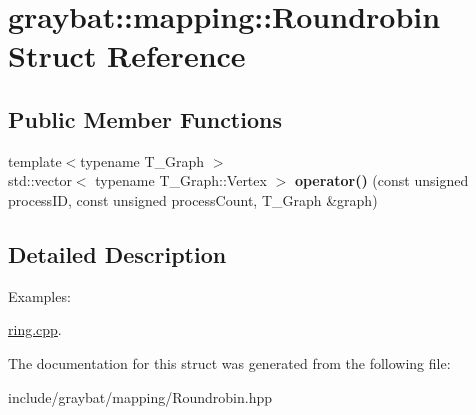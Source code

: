 \hypertarget{structgraybat_1_1mapping_1_1Roundrobin}{}\section{graybat\+:\+:mapping\+:\+:Roundrobin Struct Reference}
\label{structgraybat_1_1mapping_1_1Roundrobin}
\subsection*{Public Member Functions}
\begin{DoxyCompactItemize}
\item 
\hypertarget{structgraybat_1_1mapping_1_1Roundrobin_ab3d4c60dcd47a3827739cf824e3e0f6b}{}{\footnotesize template$<$typename T\+\_\+\+Graph $>$ }\\std\+::vector$<$ typename T\+\_\+\+Graph\+::\+Vertex $>$ {\bfseries operator()} (const unsigned process\+I\+D, const unsigned process\+Count, T\+\_\+\+Graph \&graph)\label{structgraybat_1_1mapping_1_1Roundrobin_ab3d4c60dcd47a3827739cf824e3e0f6b}

\end{DoxyCompactItemize}


\subsection{Detailed Description}
\begin{Desc}
\item[Examples\+: ]\par
\hyperlink{ring_8cpp-example}{ring.\+cpp}.\end{Desc}


The documentation for this struct was generated from the following file\+:\begin{DoxyCompactItemize}
\item 
include/graybat/mapping/Roundrobin.\+hpp\end{DoxyCompactItemize}
